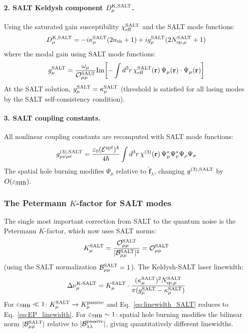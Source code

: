 \documentclass[12pt]{article}
\newcommand{\zpf}{{\rm zpf}}
\newcommand{\Keldysh}{{\rm K}}
\newcommand{\tf}{\tilde{\mathbf{f}}}
\begin{document}
\paragraph{2. SALT Keldysh component $D^{\Keldysh,\rm SALT}_\mu$.}
Using the saturated gain susceptibility $\chi_{\rm eff}^{\rm SALT}$ and
the SALT mode functions:
\begin{equation}
  D^{\Keldysh,\rm SALT}_\mu =
  -i\kappa_\mu^{\rm SALT}(2n_{\rm th}+1)
  + i g_\mu^{\rm SALT}(2N_{\rm sp,\mu}^{\rm SALT}+1)
  \label{eq:DK_SALT}
\end{equation}
where the modal gain using SALT mode functions:
\begin{equation}
  g_\mu^{\rm SALT} =
  \frac{\omega_\mu}{\mathcal{O}_{\mu\mu}^{\rm SALT}}
  \mathrm{Im}\!\left[-\int d^3r\,
  \chi_{\rm eff}^{\rm SALT}(\mathbf{r})\,
  \Psi_\mu(\mathbf{r})\cdot\Psi_\mu(\mathbf{r})\right]
  \label{eq:g_SALT}
\end{equation}
At the SALT solution, $g_\mu^{\rm SALT} = \kappa_\mu^{\rm SALT}$
(threshold is satisfied for all lasing modes by the SALT self-consistency
condition).

\paragraph{3. SALT coupling constants.}
All nonlinear coupling constants are recomputed with SALT mode functions:
\begin{equation}
  g^{(3),\rm SALT}_{\mu\nu\rho\sigma} =
  \frac{\varepsilon_0(\mathcal{E}^\zpf)^4}{4\hbar}
  \int d^3r\,\chi^{(3)}(\mathbf{r})\,
  \Psi_\mu^*\Psi_\nu^*\Psi_\rho\Psi_\sigma
  \label{eq:g3_SALT}
\end{equation}
The spatial hole burning modifies $\Psi_\mu$ relative to $\tf_\lambda$,
changing $g^{(3),\rm SALT}$ by $O(\varepsilon_{\rm SHB})$.

\subsubsection*{The Petermann $K$-factor for SALT modes}

The single most important correction from SALT to the quantum noise
is the Petermann $K$-factor, which now uses SALT norms:
\begin{equation}
  K_\mu^{\rm SALT} =
  \frac{\mathcal{O}_{\mu\mu}^{\rm SALT}}
  {|\mathcal{B}_{\mu\mu}^{\rm SALT}|^2}
  = \mathcal{O}_{\mu\mu}^{\rm SALT}
  \label{eq:K_SALT}
\end{equation}
(using the SALT normalization $\mathcal{B}_{\mu\mu}^{\rm SALT}=1$).
The Keldysh-SALT laser linewidth:
\begin{equation}
  \Delta\nu_\mu^{\rm K\text{-}SALT} =
  K_\mu^{\rm SALT}\cdot\frac{(\kappa_\mu^{\rm SALT})^2 N_{\rm sp,\mu}^{\rm SALT}}
  {\pi(g_\mu^{\rm SALT} - \kappa_\mu^{\rm SALT})}
  \label{eq:linewidth_SALT}
\end{equation}
For $\varepsilon_{\rm SHB}\ll 1$: $K_\mu^{\rm SALT}\to K_\mu^{\rm passive}$
and Eq.~\eqref{eq:linewidth_SALT} reduces to Eq.~\eqref{eq:EP_linewidth}.
For $\varepsilon_{\rm SHB}\sim 1$: spatial hole burning modifies the
bilinear norm $|\mathcal{B}_{\mu\mu}^{\rm SALT}|$ relative to
$|\mathcal{B}_{\lambda\lambda}^{\rm passive}|$, giving quantitatively
different linewidths.
\end{document}
